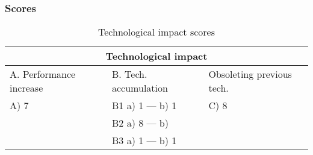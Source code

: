 \subsubsection{Scores}
\begin{table}[h]
\centering
\begin{tabular}{l l l}
\hline
\multicolumn{3}{|c|}{Technological impact} \\
\hline
A. Performance increase & B. Tech. accumulation & Obsoleting previous tech.\\
A) 7 & B1 a) 1 --- b) 1 & C) 8\\ 
     & B2 a) 8 --- b)  & \\
     & B3 a) 1 --- b) 1 & \\
\hline
\end{tabular}
\caption{Technological impact scores}
\label{tbl:impactscores4}
\end{table}